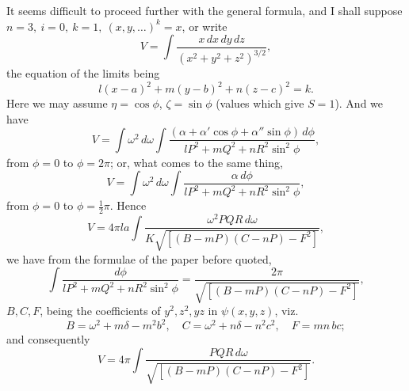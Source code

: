 \documentclass[11pt]{article}
\begin{document}
It seems difficult to proceed further with the general formula, and I shall suppose $n = 3,\ i = 0,\ k = 1,\ (x, y, \ldots)^k = x$, or write
\[ V = \int \frac{x\,dx\,dy\,dz}{(x^2 + y^2 + z^2)^{3/2}}, \]
the equation of the limits being
\[ l(x - a)^2 + m(y - b)^2 + n(z - c)^2 = k. \]
Here we may assume $\eta = \cos\phi$, $\zeta = \sin\phi$ (values which give $S = 1$). And we have
\[ V = \int \omega^2\,d\omega \int \frac{(\alpha + \alpha'\cos\phi + \alpha''\sin\phi)\,d\phi}{lP^2 + mQ^2 + nR^2 \sin^2\phi}, \]
from $\phi = 0$ to $\phi = 2\pi$; or, what comes to the same thing,
\[ V = \int \omega^2\,d\omega \int \frac{\alpha\,d\phi}{lP^2 + mQ^2 + nR^2 \sin^2\phi}, \]
from $\phi = 0$ to $\phi = \tfrac{1}{2}\pi$. Hence
\[ V = 4\pi la \int \frac{\omega^2 PQR\,d\omega}{K\sqrt{[(B - mP)(C - nP) - F^2]}}, \]
we have from the formulae of the paper before quoted,
\[ \int \frac{d\phi}{lP^2 + mQ^2 + nR^2 \sin^2\phi} = \frac{2\pi}{\sqrt{[(B - mP)(C - nP) - F^2]}}, \]
$B, C, F$, being the coefficients of $y^2, z^2, yz$ in $\psi(x, y, z)$, viz.
\[ B = \omega^2 + m\delta - m^2 b^2,\quad C = \omega^2 + n\delta - n^2 c^2,\quad F = mn\,bc; \]
and consequently
\[ V = 4\pi \int \frac{PQR\,d\omega}{\sqrt{[(B - mP)(C - nP) - F^2]}}. \]
\end{document}
